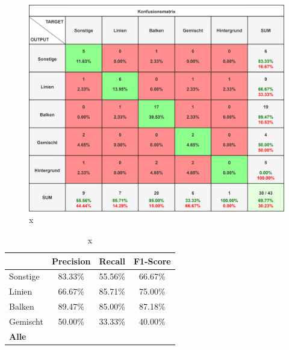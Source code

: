 \begin{figure}[H]
    \centering
    \captionsetup{width=1\linewidth}
    \includegraphics[width=1\textwidth]{Experimente/img/detect/2_val@0.511_200_nohisto/konfusionsmatrix.png}
    \caption{ x}
    \label{fig:extraction_output}
\end{figure}

\begin{table}[H]
    \centering
    \begin{tabular}{|l|c|c|c|}
        \hline
        \rowcolor[HTML]{EFEFEF}
                      & Precision & Recall    & F1-Score  \\ \hline
        Sonstige      & 83.33\%   & 55.56\%   & 66.67\%   \\ \hline
        Linien        & 66.67\%   & 85.71\%   & 75.00\%   \\ \hline
        Balken        & 89.47\%   & 85.00\%   & 87.18\%   \\ \hline
        Gemischt      & 50.00\%   & 33.33\%   & 40.00\%   \\ \hline
        \textbf{Alle} & \textbf{} & \textbf{} & \textbf{} \\ \hline
    \end{tabular}
    \caption{x}
\end{table}


